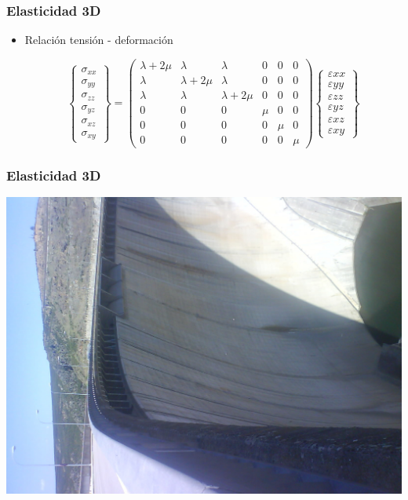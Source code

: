 \documentclass{beamer}
\begin{document}
\begin{frame}
\frametitle{Elasticidad 3D}
\begin{itemize}
\item Relación tensión -  deformación
\begin{small}
\begin{equation}
\left\{
\begin{array}{c}
\sigma_{xx} \\
\sigma_{yy} \\
\sigma_{zz} \\
\sigma_{yz} \\
\sigma_{xz} \\
\sigma_{xy}
\end{array}
\right\}=
\left(
\begin{array}{cccccc}
\lambda + 2 \mu & \lambda       & \lambda       & 0     & 0     & 0     \\
\lambda         & \lambda+2 \mu & \lambda       & 0     & 0     & 0     \\
\lambda         & \lambda       & \lambda+2 \mu & 0     & 0     & 0     \\
0               & 0             & 0             & \mu   & 0     & 0     \\
0               & 0             & 0             & 0     & \mu   & 0     \\
0               & 0             & 0             & 0     & 0     & \mu   
\end{array}
\right)
\left\{
\begin{array}{c}
\varepsilon{xx} \\
\varepsilon{yy} \\
\varepsilon{zz} \\
\varepsilon{yz} \\
\varepsilon{xz} \\
\varepsilon{xy}
\end{array}
\right\}
\end{equation}
\end{small}
\end{itemize}
\end{frame}
\begin{frame}
\frametitle{Elasticidad 3D}
\begin{center}
\includegraphics[width=0.85\textheight,angle=-90]{el_atazar_02}
\end{center}
\end{frame}
\end{document}
